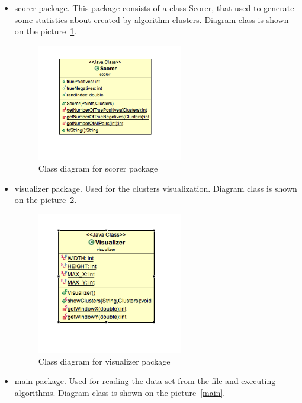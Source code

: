 \documentclass[12pt, a4paper, notitlepage, oneside]{article}
\begin{document}
\begin{itemize}
	\item scorer package. This package consists of a class Scorer, that used to generate some statistics about created by algorithm clusters. Diagram class is shown on the picture~\ref{scorer}.

	\begin{figure}[!ht]
 	\centering
	\includegraphics[width=0.6\textwidth]{images/scorer_package.png}
 	\caption[]
	{Class diagram for scorer package}
	\label{scorer}
	\end{figure}

\item visualizer package. Used for  the clusters visualization. Diagram class is shown on the picture~\ref{visualizer}.

	\begin{figure}[!ht]
 	\centering
	\includegraphics[width=0.6\textwidth]{images/visualizer_package.png}
 	\caption[]
	{Class diagram for visualizer package}
\label{visualizer}
	\end{figure}

\item main package. Used for  reading the data set from the file and executing algorithms. Diagram class is shown on the picture~\ref{main}.


\end{itemize}
\end{document}
